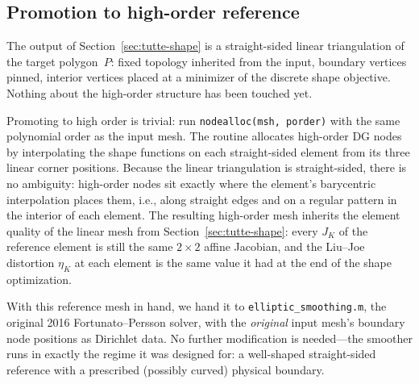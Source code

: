 \documentclass[11pt]{article}
\begin{document}

\subsection{Promotion to high-order reference}
\label{sec:tutte-highorder}

The output of Section~\ref{sec:tutte-shape} is a straight-sided
linear triangulation of the target polygon~$P$: fixed topology
inherited from the input, boundary vertices pinned, interior
vertices placed at a minimizer of the discrete shape objective.
Nothing about the high-order structure has been touched yet.

Promoting to high order is trivial: run
\texttt{nodealloc(msh, porder)} with the same polynomial order as
the input mesh. The routine allocates high-order DG nodes by
interpolating the shape functions on each straight-sided element
from its three linear corner positions. Because the linear
triangulation is straight-sided, there is no ambiguity: high-order
nodes sit exactly where the element's barycentric interpolation
places them, i.e., along straight edges and on a regular pattern
in the interior of each element. The resulting high-order mesh
inherits the element quality of the linear mesh from
Section~\ref{sec:tutte-shape}: every $J_K$ of the reference element
is still the same $2 \times 2$ affine Jacobian, and the Liu--Joe
distortion $\eta_K$ at each element is the same value it had at the
end of the shape optimization.

With this reference mesh in hand, we hand it to
\texttt{elliptic\_smoothing.m}, the original 2016
Fortunato--Persson solver, with the \emph{original} input mesh's
boundary node positions as Dirichlet data. No further modification
is needed---the smoother runs in exactly the regime it was designed
for: a well-shaped straight-sided reference with a prescribed
(possibly curved) physical boundary.
\end{document}
